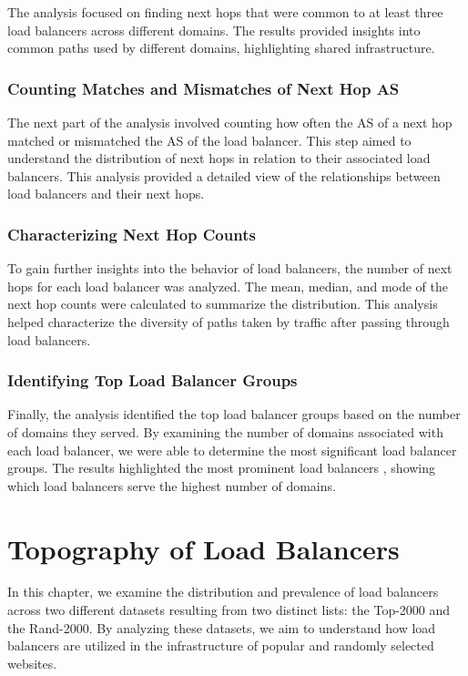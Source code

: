 \documentclass[12pt]{cwru_thesis}
\begin{document}
The analysis focused on finding next hops that were common to at least three load balancers across different domains. The results provided insights into common paths used by different domains, highlighting shared infrastructure.

\subsection{Counting Matches and Mismatches of Next Hop AS}

The next part of the analysis involved counting how often the AS of a next hop matched or mismatched the AS of the load balancer. This step aimed to understand the distribution of next hops in relation to their associated load balancers. This analysis provided a detailed view of the relationships between load balancers and their next hops.

\subsection{Characterizing Next Hop Counts}

To gain further insights into the behavior of load balancers, the number of next hops for each load balancer was analyzed. The mean, median, and mode of the next hop counts were calculated to summarize the distribution. This analysis helped characterize the diversity of paths taken by traffic after passing through load balancers.



\subsection{Identifying Top Load Balancer Groups}

Finally, the analysis identified the top load balancer groups based on the number of domains they served. By examining the number of domains associated with each load balancer, we were able to determine the most significant load balancer groups. The results highlighted the most prominent load balancers , showing which load balancers serve the highest number of domains. 




\chapter{Topography of Load Balancers}

In this chapter, we examine the distribution and prevalence of load balancers across two different datasets resulting from two distinct lists: the Top-2000 and the Rand-2000. By analyzing these datasets, we aim to understand how load balancers are utilized in the infrastructure of popular and randomly selected websites. 
\end{document}
